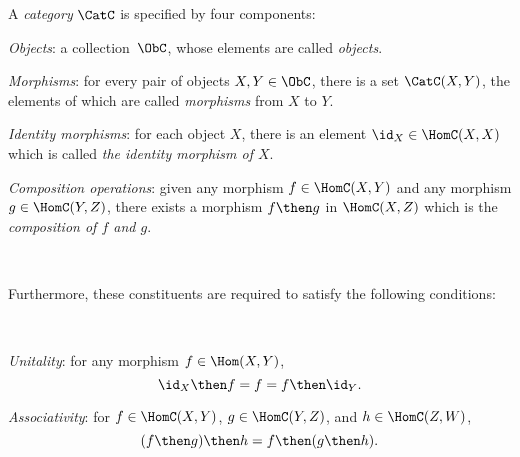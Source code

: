 \begin{shaded}
\begin{definition}[Category] \label{def:categorymain}
A \emph{category} $\CatC$ is specified by four components: 
\begin{compactenum}
\item \emph{Objects}: a collection\footnotemark \  $\ObC$, whose elements are called \emph{objects}.
\item \emph{Morphisms}: for every pair of objects $X, Y\in \ObC$, there is a set $\CatC(X, Y)$, the elements of which are called
\emph{morphisms} from $X$ to $Y$. 
\item \emph{Identity morphisms}:  for each object $X$, there is
an element $\id_X \in \HomC(X,X) $ which is called \emph{the identity
morphism of $X$}.
\item \emph{Composition operations}: given any morphism $f \in  \HomC(X,Y) $ and any morphism $g \in \HomC(Y, Z)$, there exists a morphism $f\then g$ in $\HomC(X, Z)$ which is the \emph{composition of $f$ and $g$}.
\end{compactenum}

\

Furthermore, these constituents are required to satisfy the following conditions:

\

\begin{compactenum}
    \item \emph{Unitality}: for any morphism $f\in\Hom(X,Y)$, 
    \begin{equation}
        \id_X \then f= f = f \then \id_Y.
    \end{equation}
    \item \emph{Associativity}: for $f\in \HomC(X,Y)$, $g\in \HomC(Y,Z)$, and $h\in \HomC(Z,W)$,
    \begin{equation}
        (f\then g)\then h= f \then (g \then h).
    \end{equation}
\end{compactenum}

\end{definition}
\end{shaded}


